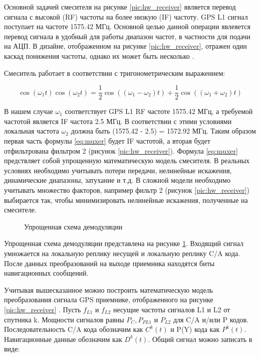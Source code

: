 Основной задачей смесителя на рисунке \ref{pic:hw_receiver} является перевод сигнала с высокой (RF) частоты на более низкую (IF)
частоту. GPS L1 сигнал поступает на частоте 1575.42 МГц. Основной целью данной операции явлеяется перевод сигнала
в удобный для работы диапазон частот, в частности для подачи на АЦП. В дизайне, отображенном на рисунке \ref{pic:hw_receiver},
отражен один каскад понижения частоты, однако их может быть несколько \cite{gps}. 

Смеситель работает в соответствии с тригонометрическим выражением:

\begin{equation}
\cos(\omega_1 t)\cos(\omega_2 t) = 
	\frac{1}{2}\cos((\omega_1 - \omega_2)t) + \frac{1}{2}\cos((\omega_1 + \omega_2)t)
\label{eq:muxer}
\end{equation}

В нашем случае ${\omega_1}$ соответствует GPS L1 RF частоте 1575.42 МГц, а требуемой частотой является IF частота 2.5 МГц. В соответствии 
с этими условиями локальная частота ${\omega_2}$ должна быть (1575.42 - 2.5) = 1572.92 МГц. Таким образом первая часть формулы
\ref{eq:muxer} будет IF частотой, а вторая будет отфильтрована фильтром 2 (рисунок \ref{pic:hw_receiver}). Формула \ref{eq:muxer} 
предствляет собой упрощенную математическую модель смесителя. В реальных условиях необходимо учитывать потери передачи, нелинейные
искажения, динамические диапазоны, затухание и т.д. В сложной модели необходимо учитывать множество факторов, например
фильтр 2 (рисунок \ref{pic:hw_receiver}) выбирается так, чтобы минимизировать нелинейные искажения, полученные на смесителе.

\begin{figure}[h]
\begin{center}
\end{center}
\caption{Упрощенная схема демодуляции}
\label{pic:signal_conversion}
\end{figure}

Упрощенная схема демодуляции представлена на рисунке \ref{pic:signal_conversion}. Входящий сигнал умножается на локальную реплику несущей
и локальную реплику C/A кода. После данных преобразований на выходе приемника находятся биты навигационных сообщений.

Учитывая вышесказанное можно построить математическую модель преобразования сигнала GPS приемнике,
отображенного на рисунке \ref{pic:hw_receiver} \cite{gps}.
Пусть ${f_{L1}}$ и ${f_{L2}}$ несущие частоты сигналов L1 и L2 от спутника k. Мощности сигналов равны  ${P_C, P_{PL1}}$ и
${P_{L2}}$ для C/A и/или P кодов. Последовательность C/A кода обозначим как ${C^k(t)}$ и P(Y) кода как ${P^k(t)}$.
Навигационные данные обозначим как ${D^k(t)}$. Общий сигнал можно записать в виде:

